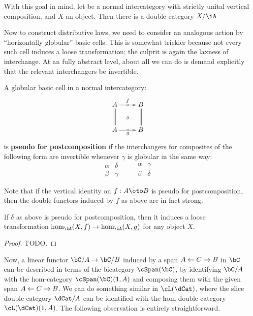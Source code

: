\documentclass{amsart}
\begin{document}
With this goal in mind, let \iA be a normal intercategory with strictly unital vertical composition, and $X$ an object.
Then there is a double category $X/\iA$


Now to construct distributive laws, we need to consider an analogous action by ``horizontally globular'' basic cells.
This is somewhat trickier because not every such cell induces a loose transformation; the culprit is again the laxness of interchange.
At an fully abstract level, about all we can do is demand explicitly that the relevant interchangers be invertible.

\begin{defn}
  A globular basic cell in a normal intercategory:
  \[ \xymatrix{A \ar@{=}[d] \ar[r]|{\circ}^f \ar@{}[dr]|{\delta} & B \ar@{=}[d] \\ A \ar[r]|{\circ}_g & B } \]
  is \textbf{pseudo for postcomposition} if the interchangers for composites of the following form are invertible whenever $\gamma$ is globular in the same way:
  \[
  \begin{array}{c|c}
    \alpha&\delta\\\hline\beta& \gamma %
  \end{array}\qquad
  \begin{array}{c|c}
    \alpha& \gamma %
    \\\hline\beta&\delta
  \end{array}
  \]
\end{defn}

Note that if the vertical identity on $f:A\oto B$ is pseudo for postcomposition, then the double functors induced by $f$ as above are in fact strong.

\begin{lem}
  If $\delta$ as above is pseudo for postcomposition, then it induces a loose transformation $\hom_\iA(X,f) \to \hom_\iA(X,g)$ for any object $X$.
\end{lem}
\begin{proof}
  TODO.
\end{proof}



Now, a linear functor $\bC/A\to \bC/B$ induced by a span $A \leftarrow C \to B$ in $\bC$ can be described in terms of the bicategory $\cSpan(\bC)$, by identifying $\bC/A$ with the hom-category $\cSpan(\bC)(1,A)$ and composing them with the given span $A \leftarrow C \to B$.
We can do something similar in $\cL(\dCat)$, where the slice double category $\dCat/A$ can be identified with the hom-double-category $\cL(\dCat)(1,A)$.
The following observation is entirely straightforward.
\end{document}
